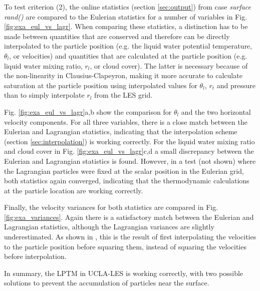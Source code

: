 \documentclass[twoside,a4paper]{report}
\begin{document}
To test criterion (2), the online statistics (section \ref{sec:output}) from case \textit{surface rand()} are compared to the Eulerian statistics for a number of variables in Fig. \ref{fig:exa_eul_vs_lagr}. When comparing these statistics, a distinction has to be made between quantities that are conserved and therefore can be directly interpolated to the particle position (e.g. the liquid water potential temperature, $\theta_l$, or velocities) and quantities that are calculated at the particle position (e.g. liquid water mixing ratio, $r_l$, or cloud cover). The latter is necessary because of the non-linearity in Clausius-Clapeyron, making it more accurate to calculate saturation at the particle position using interpolated values for $\theta_l$, $r_t$ and pressure than to simply interpolate $r_l$ from the LES grid. \newline

Fig. \ref{fig:exa_eul_vs_lagr}a,b show the comparison for $\theta_l$ and the two horizontal velocity components. For all three variables, there is a close match between the Eulerian and Lagrangian statistics, indicating that the interpolation scheme (section \ref{sec:interpolation}) is working correctly. For the liquid water mixing ratio and cloud cover in Fig. \ref{fig:exa_eul_vs_lagr}c,d a small discrepancy between the Eulerian and Lagrangian statistics is found. However, in a test (not shown) where the Lagrangian particles were fixed at the scalar position in the Eulerian grid, both statistics again converged, indicating that the thermodynamic calculations at the particle location are working correctly. \newline

Finally, the velocity variances for both statistics are compared in Fig. \ref{fig:exa_variances}. Again there is a satisfactory match between the Eulerian and Lagrangian statistics, although the Lagrangian variances are slightly underestimated. As shown in \cite{heus2008}, this is the result of first interpolating the velocities to the particle position before squaring them, instead of squaring the velocities before interpolation.\newline

In summary, the LPTM in UCLA-LES is working correctly, with two possible solutions to prevent the accumulation of particles near the surface. 
\end{document}
